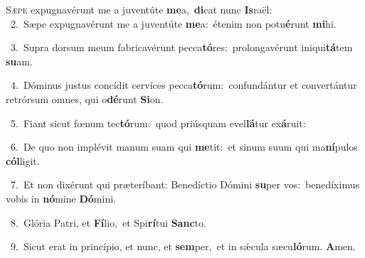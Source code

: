 \lettrine{\initial\textcolor{\initialcolor}{S}}{æpe} expugnavérunt me a juventúte \textbf{me}\-a,~\star \textbf{di}\-cat nunc \textbf{Is}\-raël:\\
{\numbfont\textcolor{\numbcolor}{~2.}}~Sæpe expugnavérunt me a juventúte \textbf{me}\-a:~\star étenim non potu\-\textbf{é}\-runt \textbf{mi}\-hi.\par
{\numbfont\textcolor{\numbcolor}{~3.}}~Supra dorsum meum fabricavérunt pecca\-\textbf{tó}\-res:~\star prolongavérunt iniqui\-\textbf{tá}\-tem \textbf{su}\-am.\par
{\numbfont\textcolor{\numbcolor}{~4.}}~Dóminus justus concídit cervíces pecca\-\textbf{tó}\-rum:~\star confundántur et convertántur retrórsum omnes, qui o\-\textbf{dé}\-runt \textbf{Si}\-on.\par
{\numbfont\textcolor{\numbcolor}{~5.}}~Fiant sicut fœnum tec\-\textbf{tó}\-rum:~\star quod priúsquam evel\-\textbf{lá}\-tur ex\-\textbf{á}\-ruit:\par
{\numbfont\textcolor{\numbcolor}{~6.}}~De quo non implévit manum suam qui \textbf{me}\-tit:~\star et sinum suum qui ma\-\textbf{ní}\-pulos \textbf{cól}\-ligit.\par
{\numbfont\textcolor{\numbcolor}{~7.}}~Et non dixérunt qui præteríbant: Benedíctio Dómini \textbf{su}\-per vos:~\star benedíximus vobis in \textbf{nó}\-mine \textbf{Dó}\-mini.\par
{\numbfont\textcolor{\numbcolor}{~8.}}~Glória Patri, et \textbf{Fí}\-lio,~\star et Spi\-\textbf{rí}\-tui \textbf{Sanc}\-to.\par
{\numbfont\textcolor{\numbcolor}{~9.}}~Sicut erat in princípio, et nunc, et \textbf{sem}\-per,~\star et in sǽcula sæcu\-\textbf{ló}\-rum. \textbf{A}\-men.\par
